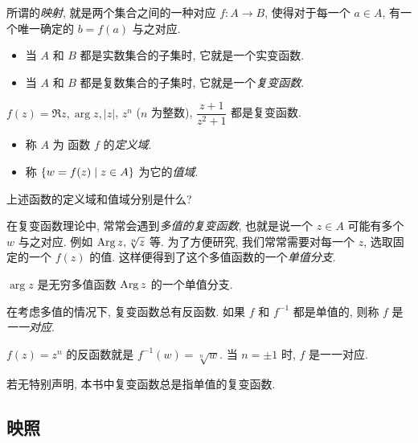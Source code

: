所谓的\emph{映射}, 就是两个集合之间的一种对应 $f:A\to B$, 使得对于每一个 $a\in A$, 有一个唯一确定的 $b=f(a)$ 与之对应.
\begin{itemize}
  \item 当 $A$ 和 $B$ 都是实数集合的子集时, 它就是一个实变函数.
  \item 当 $A$ 和 $B$ 都是复数集合的子集时, 它就是一个\emph{复变函数}.
\end{itemize}

\begin{example}
  $f(z)=\Re z,\arg z,|z|$, $z^n$ ($n$ 为整数), $\dfrac{z+1}{z^2+1}$ 都是复变函数.
\end{example}

\begin{definition}[复变函数的定义域和值域]
  \begin{itemize}
    \item 称 $A$ 为 函数 $f$ 的\emph{定义域}.
    \item 称 ${\left\{w=f(z)\mid z\in A\right\}}$ 为它的\emph{值域}.\footnotemark
  \end{itemize} 
\end{definition}
\begin{exercise}
  上述函数的定义域和值域分别是什么?
\end{exercise}

在复变函数理论中, 常常会遇到\emph{多值的复变函数}, 也就是说一个 $z\in A$ 可能有多个 $w$ 与之对应.
例如 $\operatorname{Arg} z,\sqrt[n]z$ 等.
为了方便研究, 我们常常需要对每一个 $z$, 选取固定的一个 $f(z)$ 的值.
这样便得到了这个多值函数的一个\emph{单值分支}.
\begin{example}
  $\arg z$ 是无穷多值函数 $\operatorname{Arg} z$ 的一个单值分支.
\end{example}

在考虑多值的情况下, 复变函数总有反函数.
如果 $f$ 和 $f^{-1}$ 都是单值的, 则称 $f$ 是\emph{一一对应}.
\begin{example}
  $f(z)=z^n$ 的反函数就是 $f^{-1}(w)=\sqrt[n]{w}$.
  {当 $n=\pm1$ 时, $f$ 是一一对应.}
\end{example}
若无特别声明, 本书中\alert{复变函数总是指单值的复变函数}.


\subsection{映照}

